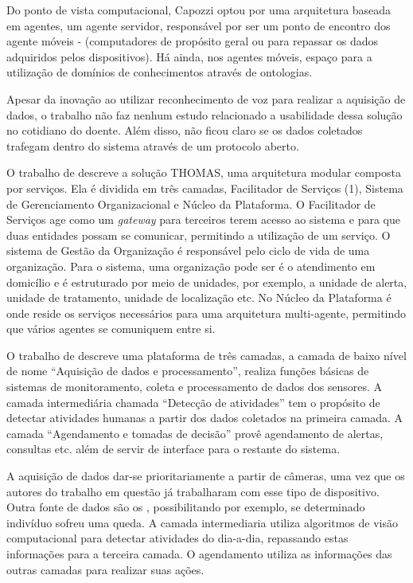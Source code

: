 Do ponto de vista computacional, Capozzi optou por uma arquitetura baseada em
agentes, um agente servidor, responsável por ser um ponto de encontro dos
agente móveis - (computadores de propósito geral ou \smartphones[] para repassar
os dados adquiridos pelos dispositivos). Há ainda, nos agentes móveis, espaço
para a utilização de domínios de conhecimentos através de ontologias.
 
Apesar da inovação ao utilizar reconhecimento de voz para realizar a aquisição
de dados, o trabalho não faz nenhum estudo relacionado a usabilidade dessa
solução no cotidiano do doente. Além disso, não ficou claro se os dados
coletados trafegam dentro do sistema através de um protocolo aberto.

O trabalho de  descreve a solução THOMAS, uma
arquitetura modular composta por serviços. Ela é dividida em três camadas,
Facilitador de Serviços (1), Sistema de Gerenciamento Organizacional e Núcleo
da Plataforma. O Facilitador de Serviços age como um \textit{gateway} para terceiros
terem acesso ao sistema e para que duas entidades possam se comunicar,
permitindo a utilização de um serviço. O sistema de Gestão da Organização é
responsável pelo ciclo de vida de uma organização. Para o sistema, uma
organização pode ser é o atendimento em domicílio e é estruturado por meio de
unidades, por exemplo, a unidade de alerta, unidade de tratamento, unidade de
localização  etc. No Núcleo da Plataforma é onde reside os serviços necessários
para uma arquitetura multi-agente, permitindo que vários agentes se comuniquem
entre si.

O trabalho de  descreve uma plataforma de três
camadas, a camada de baixo nível de nome ``Aquisição de dados e processamento'',
realiza funções básicas de sistemas de monitoramento, coleta e processamento de
dados dos sensores. A camada intermediária chamada ``Detecção de atividades'' tem
o propósito de detectar atividades humanas a partir dos dados coletados na
primeira camada. A camada ``Agendamento e tomadas de decisão'' provê agendamento
de alertas, consultas etc.  além de servir de interface para o restante do
sistema.

A aquisição de dados dar-se prioritariamente a partir de câmeras, uma vez que
os autores do trabalho em questão já trabalharam com esse tipo de dispositivo.
Outra fonte de dados são os \smartphones, possibilitando por exemplo, se
determinado indivíduo sofreu uma queda. A camada intermediaria utiliza
algoritmos de visão computacional para detectar atividades do dia-a-dia,
repassando estas informações para a terceira camada. O agendamento utiliza as
informações das outras camadas para realizar suas ações. 

